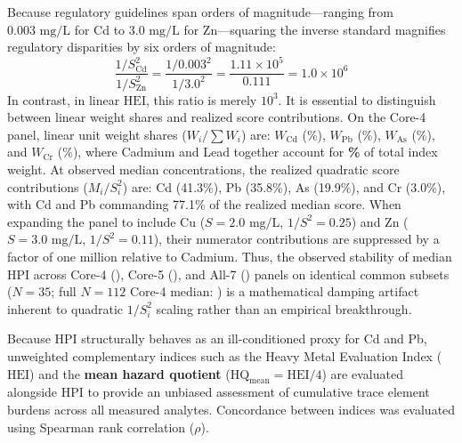 \documentclass[authoryear,preprint,12pt]{elsarticle}
\begin{document}
Because regulatory guidelines span orders of magnitude—ranging from $0.003\text{ mg/L}$ for Cd to $3.0\text{ mg/L}$ for Zn—squaring the inverse standard magnifies regulatory disparities by six orders of magnitude:
\begin{equation}
\frac{1 / S_{\mathrm{Cd}}^2}{1 / S_{\mathrm{Zn}}^2} = \frac{1 / 0.003^2}{1 / 3.0^2} = \frac{1.11 \times 10^5}{0.111} = 1.0 \times 10^6
\end{equation}
In contrast, in linear $\mathrm{HEI}$, this ratio is merely $10^3$. It is essential to distinguish between linear weight shares and realized score contributions. On the Core-4 panel, linear unit weight shares ($W_i / \sum W_i$) are: $W_{\mathrm{Cd}}$ (\HpiCdWeightSharePct\%), $W_{\mathrm{Pb}}$ (\HpiPbWeightSharePct\%), $W_{\mathrm{As}}$ (\HpiAsWeightSharePct\%), and $W_{\mathrm{Cr}}$ (\HpiCrWeightSharePct\%), where Cadmium and Lead together account for \textbf{\HpiCdPbWeightSharePct\%} of total index weight. At observed median concentrations, the realized quadratic score contributions ($M_i / S_i^2$) are: Cd (41.3\%), Pb (35.8\%), As (19.9\%), and Cr (3.0\%), with Cd and Pb commanding 77.1\% of the realized median score. When expanding the panel to include Cu ($S=2.0\text{ mg/L}$, $1/S^2 = 0.25$) and Zn ($S=3.0\text{ mg/L}$, $1/S^2 = 0.11$), their numerator contributions are suppressed by a factor of one million relative to Cadmium. Thus, the observed stability of median HPI across Core-4 (\HpiCommonSubsetCoreFourMedian), Core-5 (\HpiCommonSubsetCoreFiveMedian), and All-7 (\HpiCommonSubsetAllSevenMedian) panels on identical common subsets ($N=35$; full $N=112$ Core-4 median: \HpiCoreFourMedian) is a mathematical damping artifact inherent to quadratic $1/S_i^2$ scaling rather than an empirical breakthrough. 

Because HPI structurally behaves as an ill-conditioned proxy for Cd and Pb, unweighted complementary indices such as the Heavy Metal Evaluation Index ($\mathrm{HEI}$) and the \textbf{mean hazard quotient} ($\mathrm{HQ}_{\mathrm{mean}} = \mathrm{HEI} / 4$) \citep{Edet2002} are evaluated alongside HPI to provide an unbiased assessment of cumulative trace element burdens across all measured analytes. Concordance between indices was evaluated using Spearman rank correlation ($\rho$).
\end{document}

